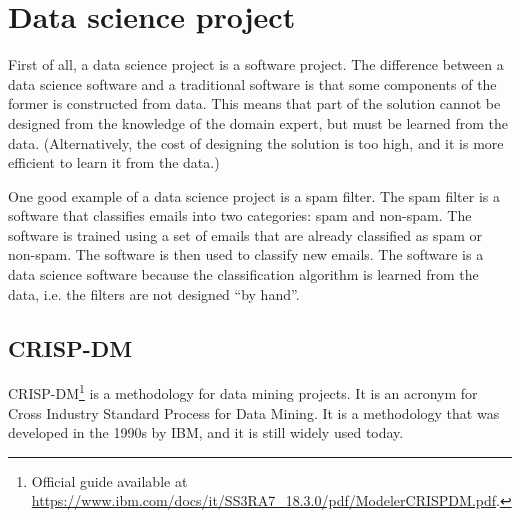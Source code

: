 \chapter{Data science project}


First of all, a data science project is a software project.  The difference between a data
science software and a traditional software is that some components of the former is
constructed from data.  This means that part of the solution cannot be designed from the
knowledge of the domain expert, but must be learned from the data.  (Alternatively, the
cost of designing the solution is too high, and it is more efficient to learn it from the data.)

One good example of a data science project is a spam filter.  The spam filter is a software
that classifies emails into two categories: spam and non-spam.  The software is trained
using a set of emails that are already classified as spam or non-spam.  The software is
then used to classify new emails.  The software is a data science software because the
classification algorithm is learned from the data, i.e. the filters are not designed ``by
hand''.


\section{CRISP-DM}

CRISP-DM\footnote{Official guide available at
\url{https://www.ibm.com/docs/it/SS3RA7_18.3.0/pdf/ModelerCRISPDM.pdf}.} is a methodology
for data mining projects.  It is an acronym for Cross Industry Standard Process for Data
Mining.  It is a methodology that was developed in the 1990s by IBM, and it is still
widely used today.

